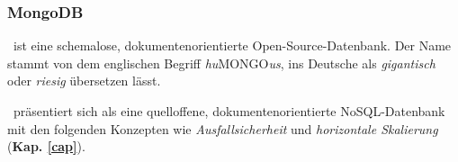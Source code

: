 
\subsubsection{MongoDB}\label{mongo}

\mongo\ ist eine  schemalose, dokumentenorientierte Open-Source-Datenbank. Der Name stammt von dem englischen Begriff \textit{hu}MONGO\textit{us}, ins Deutsche als \textit{gigantisch} oder \textit{riesig} übersetzen lässt.


%

\mongo\ präsentiert sich als eine quelloffene, dokumentenorientierte NoSQL-Datenbank mit den folgenden Konzepten wie \textit{Ausfallsicherheit} und \textit{horizontale Skalierung} (\textbf{Kap. \ref{cap}}).

